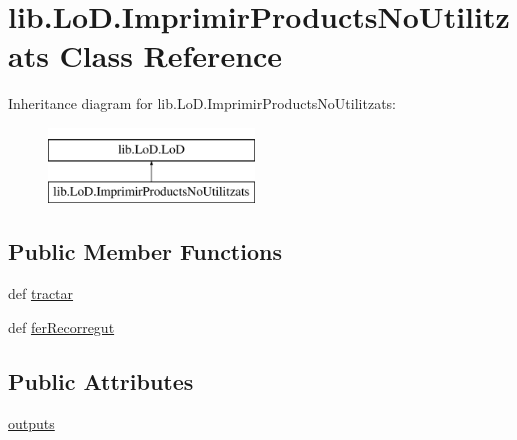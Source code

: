 \hypertarget{classlib_1_1_lo_d_1_1_imprimir_products_no_utilitzats}{\section{lib.\-Lo\-D.\-Imprimir\-Products\-No\-Utilitzats Class Reference}
\label{classlib_1_1_lo_d_1_1_imprimir_products_no_utilitzats}
}
Inheritance diagram for lib.\-Lo\-D.\-Imprimir\-Products\-No\-Utilitzats\-:\begin{figure}[H]
\begin{center}
\leavevmode
\includegraphics[height=2.000000cm]{classlib_1_1_lo_d_1_1_imprimir_products_no_utilitzats}
\end{center}
\end{figure}
\subsection*{Public Member Functions}
\begin{DoxyCompactItemize}
\item 
def \hyperlink{classlib_1_1_lo_d_1_1_imprimir_products_no_utilitzats_a26fd54884b0bbb875c0c09e684e8b3ca}{tractar}
\item 
def \hyperlink{classlib_1_1_lo_d_1_1_imprimir_products_no_utilitzats_a2f2d2013c2398d0efd6ba1ab11cba8de}{fer\-Recorregut}
\end{DoxyCompactItemize}
\subsection*{Public Attributes}
\begin{DoxyCompactItemize}
\item 
\hyperlink{classlib_1_1_lo_d_1_1_imprimir_products_no_utilitzats_a2bc4fd6eddd0931a58b93b4843ce5978}{outputs}
\end{DoxyCompactItemize}


